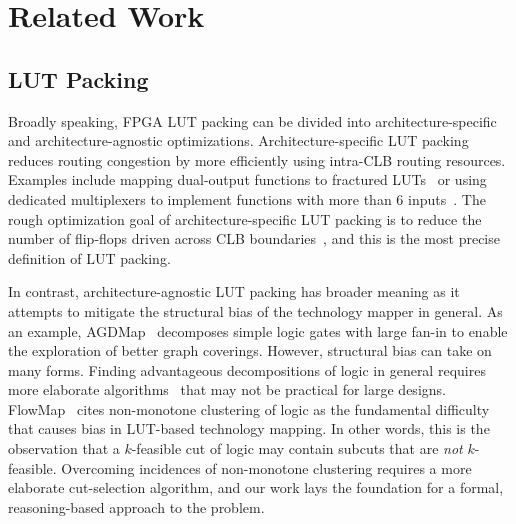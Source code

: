 \section{Related Work}\label{sec:relatedwork}
\subsection{LUT Packing}\label{sec:relatedwork:fpga}
Broadly speaking, FPGA LUT packing can be divided into architecture-specific
and architecture-agnostic optimizations. Architecture-specific LUT packing
reduces routing congestion by more efficiently using intra-CLB routing
resources. Examples include mapping dual-output functions to fractured
LUTs~\cite{fraclut} or using dedicated multiplexers to implement functions with
more than 6 inputs~\cite{ug574}. The rough optimization goal of
architecture-specific LUT packing is to reduce the number of flip-flops driven
across CLB boundaries~\cite{ffpack}, and this is the most precise definition of
LUT packing.

In contrast, architecture-agnostic LUT packing has broader meaning as it
attempts to mitigate the structural bias of the technology mapper in general.
As an example, AGDMap~\cite{adaptdecomp} decomposes simple logic gates with
large fan-in to enable the exploration of better graph coverings. However,
structural bias can take on many forms. Finding advantageous decompositions of
logic in general requires more elaborate algorithms~\cite{dsd} that may not be
practical for large designs. FlowMap~\cite{flowmap} cites non-monotone
clustering of logic as the fundamental difficulty that causes bias in LUT-based
technology mapping. In other words, this is the observation that a $k$-feasible
cut of logic may contain subcuts that are \textit{not} $k$-feasible. Overcoming
incidences of non-monotone clustering requires a more elaborate cut-selection
algorithm, and our work lays the foundation for a formal, reasoning-based
approach to the problem.


